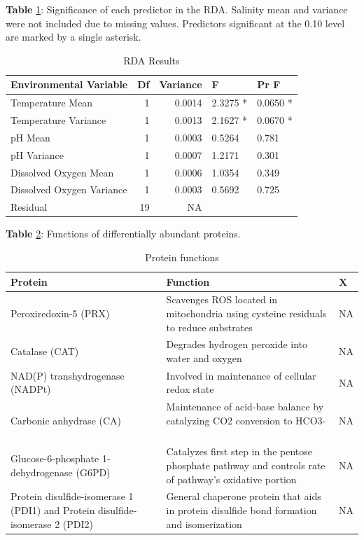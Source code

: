 \documentclass [11pt, proquest] {uwthesis}[2015/03/03]
\begin{document}
\textbf{Table} \ref{tab:RDA}: Significance of each predictor in the RDA. Salinity mean and variance were not included due to missing values. Predictors significant at the 0.10 level are marked by a single asterisk.

\begingroup\fontsize{8}{10}\selectfont
\begin{longtable}[t]{lrrll}
\caption{\label{tab:RDA}RDA Results}\\
\toprule
Environmental Variable & Df & Variance & F & Pr  F \\
\midrule
Temperature Mean & 1 & 0.0014 & 2.3275 * & 0.0650 *\\
Temperature Variance & 1 & 0.0013 & 2.1627 * & 0.0670 *\\
pH Mean & 1 & 0.0003 & 0.5264 & 0.781\\
pH Variance & 1 & 0.0007 & 1.2171 & 0.301\\
Dissolved Oxygen Mean & 1 & 0.0006 & 1.0354 & 0.349\\
\addlinespace
Dissolved Oxygen Variance & 1 & 0.0003 & 0.5692 & 0.725\\
Residual & 19 & NA &  & \\
\bottomrule
\end{longtable}
\endgroup{}
\clearpage

\textbf{Table} \ref{tab:protfunctions}: Functions of differentially abundant proteins.

\begingroup\fontsize{8}{10}\selectfont
\begin{longtable}[t]{lll}
\caption{\label{tab:protfunctions}Protein functions}\\
\toprule
Protein & Function & X\\
\midrule
Peroxiredoxin-5 (PRX) & Scavenges ROS located in mitochondria using cysteine residuals to reduce substrates & NA\\
Catalase (CAT) & Degrades hydrogen peroxide into water and oxygen & NA\\
NAD(P) transhydrogenase (NADPt) & Involved in maintenance of cellular redox state & NA\\
Carbonic anhydrase (CA) & Maintenance of acid-base balance by catalyzing CO2 conversion to HCO3-  & NA\\
Glucose-6-phosphate 1-dehydrogenase (G6PD) & Catalyzes first step in the pentose phosphate pathway and controls rate of pathway’s oxidative portion & NA\\
\addlinespace
Protein disulfide-isomerase 1 (PDI1) and Protein disulfide-isomerase 2 (PDI2) & General chaperone protein that aids in protein disulfide bond formation and isomerization & NA\\
\bottomrule
\end{longtable}
\endgroup{}
\clearpage
\end{document}
